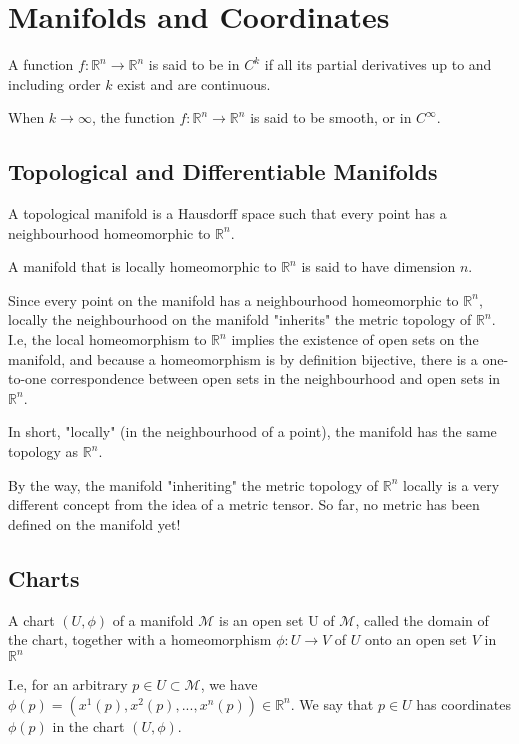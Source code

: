 \chapter{Manifolds and Coordinates}
  \begin{definition}[$C^k$ Functions]
    A function $f: \mathbb{R}^n\rightarrow \mathbb{R}^n$ is said to be in $C^k$ if all its partial derivatives up to and including order $k$ exist and are continuous.
  \end{definition}
  \begin{remark}
    When $k\rightarrow \infty$, the function $f: \mathbb{R}^n\rightarrow \mathbb{R}^n$ is said to be smooth, or in $C^{\infty}$.
  \end{remark}
  \section{Topological and Differentiable Manifolds}
    \begin{definition}
      A topological manifold is a Hausdorff space such that every point has a
      neighbourhood homeomorphic to $\mathbb{R}^n$.
    \end{definition}
    \begin{remark}
      A manifold that is locally homeomorphic to $\mathbb{R}^n$ is said to have dimension $n$.
    \end{remark}
    Since every point on the manifold has a neighbourhood homeomorphic to
    $\mathbb{R}^n$, locally the neighbourhood on the manifold "inherits"
    the metric topology of $\mathbb{R}^n$. I.e, the local homeomorphism to
    $\mathbb{R}^n$ implies the existence of open sets on the manifold, and
    because a homeomorphism is by definition bijective, there is a
    one-to-one correspondence between open sets in the neighbourhood and
    open sets in $\mathbb{R}^n$.

    In short, "locally" (in the neighbourhood of a point), the manifold has
    the same topology as $\mathbb{R}^n$.

    By the way, the manifold "inheriting" the metric topology of
    $\mathbb{R}^n$ locally is a very different concept from the idea of a
    metric tensor. So far, no metric has been defined on the manifold yet!

  \section{Charts}
    \begin{definition}[Chart]
      A chart $(U, \phi)$ of a manifold $\mathcal{M}$ is an open set U of $\mathcal{M}$, called the domain of the chart, together with a homeomorphism $\phi: U \rightarrow V$ of $U$ onto an open set $V$ in $\mathbb{R}^n$
    \end{definition}
    I.e, for an arbitrary $p\in U \subset \mathcal{M}$, we have $\phi(p) =
    \left(x^1(p), x^2(p),...,x^n(p)\right) \in \mathbb{R}^n$. We say that
    $p \in U$ has coordinates $\phi(p)$ in the chart $(U, \phi)$.

